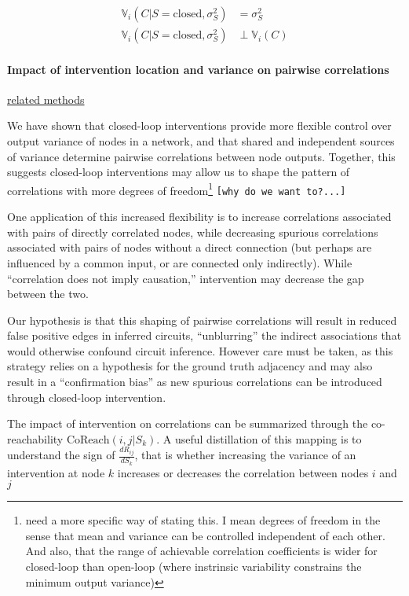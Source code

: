 \[
\begin{aligned}
\mathbb{V}_{i}(C|S=\text{closed},\sigma^2_S) &= \sigma^2_S  \\
\mathbb{V}_{i}(C|S=\text{closed},\sigma^2_S) &\perp \mathbb{V}_{i}(C)
\end{aligned}
\]

\hypertarget{impact-of-intervention-location-and-variance-on-pairwise-correlations}{%
\paragraph{Impact of intervention location and variance on pairwise
correlations}\label{impact-of-intervention-location-and-variance-on-pairwise-correlations}}

\href{methods1_predicting_correlation.md}{related methods}

We have shown that closed-loop interventions provide more flexible
control over output variance of nodes in a network, and that shared and
independent sources of variance determine pairwise correlations between
node outputs. Together, this suggests closed-loop interventions may
allow us to shape the pattern of correlations with more degrees of
freedom\footnote{need a more specific way of stating this. I mean
  degrees of freedom in the sense that mean and variance can be
  controlled independent of each other. And also, that the range of
  achievable correlation coefficients is wider for closed-loop than
  open-loop (where instrinsic variability constrains the minimum output
  variance)} \texttt{{[}why\ do\ we\ want\ to?...{]}}

One application of this increased flexibility is to increase
correlations associated with pairs of directly correlated nodes, while
decreasing spurious correlations associated with pairs of nodes without
a direct connection (but perhaps are influenced by a common input, or
are connected only indirectly). While ``correlation does not imply
causation,'' intervention may decrease the gap between the two.

Our hypothesis is that this shaping of pairwise correlations will result
in reduced false positive edges in inferred circuits, ``unblurring'' the
indirect associations that would otherwise confound circuit inference.
However care must be taken, as this strategy relies on a hypothesis for
the ground truth adjacency and may also result in a ``confirmation
bias'' as new spurious correlations can be introduced through
closed-loop intervention.

The impact of intervention on correlations can be summarized through the
co-reachability \(\text{CoReach}(i,j|S_k)\). A useful distillation of
this mapping is to understand the sign of \(\frac{dR_{ij}}{dS_k}\), that
is whether increasing the variance of an intervention at node \(k\)
increases or decreases the correlation between nodes \(i\) and \(j\)

